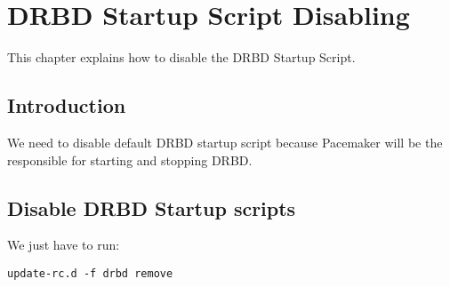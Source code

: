 

\chapter{DRBD Startup Script Disabling}
This chapter explains how to disable the DRBD Startup Script.

\section {Introduction}
We need to disable default DRBD startup script because Pacemaker will be the responsible for starting and stopping DRBD.

\section {Disable DRBD Startup scripts}
We just have to run:
\begin{verbatim}
update-rc.d -f drbd remove
\end{verbatim}
